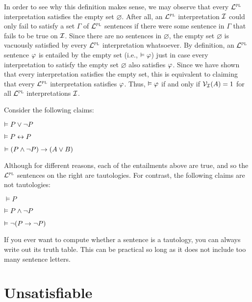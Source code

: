 In order to see why this definition makes sense, we may observe that every $\mathcal{L}^{\textsc{pl}}$ interpretation satisfies the empty set $\varnothing$.
After all, an $\mathcal{L}^{\textsc{pl}}$ interpretation $\mathcal{I}$ could only fail to satisfy a set $\Gamma$ of $\mathcal{L}^{\textsc{pl}}$ sentences if there were some sentence in $\Gamma$ that fails to be true on $\mathcal{I}$.
Since there are no sentences in $\varnothing$, the empty set $\varnothing$ is vacuously satisfied by every $\mathcal{L}^{\textsc{pl}}$ interpretation whatsoever.
By definition, an $\mathcal{L}^{\textsc{pl}}$ sentence $\varphi$ is entailed by the empty set (i.e., $\vDash \varphi$) just in case every interpretation to satisfy the empty set $\varnothing$ also satisfies $\varphi$.
Since we have shown that every interpretation satisfies the empty set, this is equivalent to claiming that every $\mathcal{L}^{\textsc{pl}}$ interpretation satisfies $\varphi$. 
Thus, $\vDash \varphi$ if and only if $\mathcal{V}_{\mathcal{I}}(A)=1$ for all $\mathcal{L}^{\textsc{pl}}$ interpretations $\mathcal{I}$.   

Consider the following claims:

\begin{earg}
  \item[] $\vDash P \vee \neg P$
  \item[] $\vDash P \leftrightarrow P$
  \item[] $\vDash (P \wedge\neg P)\rightarrow (A \vee B)$
\end{earg}

Although for different reasons, each of the entailments above are true, and so the $\mathcal{L}^{\textsc{pl}}$ sentences on the right are tautologies.
For contrast, the following claims are not tautologies:

\begin{earg}
  \item[] $\vDash P$
  \item[] $\vDash P \wedge \neg P$
  \item[] $\vDash \neg(P \rightarrow \neg P)$
\end{earg}

If you ever want to compute whether a sentence is a tautology, you can always write out its truth table.
This can be practical so long as it does not include too many sentence letters.







\section{Unsatisfiable}

